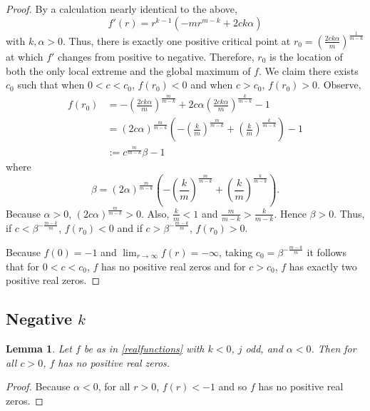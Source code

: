 \documentclass{amsart}
\newtheorem{lemma}{Lemma}
\theoremstyle{definition}
\theoremstyle{remark}
\begin{document}
    \begin{proof}
    By a calculation nearly identical to the above,
    \[
    f'(r) = r^{k-1}\left(-m r^{m-k}+2 c k \alpha  \right)
    \]
     with $k,\alpha>0$.  Thus, there is exactly one positive critical point at $r_0 =\left({\frac{2c k\alpha }{m}}\right)^{\frac{1}{m-k}}$ at which $f'$ changes from positive to negative. Therefore, $r_0$ is the location of both the only local extreme and the global maximum of $f$.  We claim there exists $c_0$ such that when $0 < c < c_0$, $f(r_0) < 0$ and when $c > c_0$, $f(r_0) > 0$. Observe,
    \begin{align*}
    f(r_0) &= -\left( \frac{2c k\alpha }{m} \right)   ^ {\frac{m}{m-k}}  + 2c\alpha \left( \frac{2c k\alpha }{m}   \right) ^ \frac{k}{m-k} - 1 \\
    &= \left(2c\alpha\right)^{\frac{m}{m-k}} \left( -\left(\frac{k}{m}\right) ^ {\frac{m}{m-k}} +  \left( \frac{k}{m} \right) ^ {\frac{k}{m-k}} \right) -1\\
    &:=c^{\frac{m}{m-k}}\beta - 1
    \end{align*}
    where 
    \[
    \beta = \left(2\alpha\right)^{\frac{m}{m-k}} \left( -\left(\frac{k}{m}\right) ^ {\frac{m}{m-k}} +  \left( \frac{k}{m} \right)^{\frac{k}{m-k}} \right).
    \]
    Because $\alpha >0$, $\left(2c\alpha\right)^{\frac{m}{m-k}} > 0$. Also, $\frac{k}{m} < 1$ and $\frac{m}{m-k} > \frac{k}{m-k}$. Hence $\beta >0$.  Thus, if $c < \beta^{-\frac{m-k}{m}}$, $f(r_0) < 0$ and if  $c > \beta^{-\frac{m-k}{m}}$, $f(r_0) > 0$. 
    
    Because $f(0)=-1$ and $\lim_{r \to \infty} f(r) = -\infty$, taking $c_0=\beta^{-\frac{m-k}{m}}$ it follows that for $0<c<c_0$, $f$ has no positive real zeros and for $c>c_0$, $f$ has exactly two positive real zeros. 
    \end{proof}

\subsection{Negative $k$}

\begin{lemma}\label{Lemma: kneg, j odd, alpha neg} 
  Let $f$ be as in \eqref{realfunctions} with $k<0$, $j$ odd, and $\alpha <0$. Then for all $c>0$, $f$ has no positive real zeros. 
\end{lemma}

  \begin{proof}
    Because $\alpha < 0 $, for all $r > 0$, $f(r) < -1$ and so $f$ has no positive real zeros.
    \end{proof}
\end{document}
